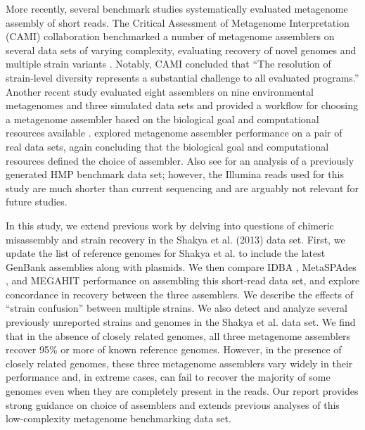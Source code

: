 \documentclass[11pt]{article}
\begin{document}

More recently, several benchmark studies systematically evaluated
metagenome assembly of short reads.  The Critical Assessment of
Metagenome Interpretation (CAMI) collaboration benchmarked a number of
metagenome assemblers on several data sets of varying complexity,
evaluating recovery of novel genomes and multiple strain variants
\cite{CAMI}.  Notably, CAMI concluded that ``The resolution of
strain-level diversity represents a substantial challenge to all
evaluated programs.''  Another recent study evaluated eight assemblers
on nine environmental metagenomes and three simulated data sets and
provided a workflow for choosing a metagenome assembler based on the
biological goal and computational resources available
\cite{metag_one}.  \cite{Vollmers2017} explored metagenome assembler
performance on a pair of real data sets, again concluding that the
biological goal and computational resources defined the choice of
assembler.  Also see \cite{Greenwald2017} for an analysis of a previously
generated HMP benchmark data set; however, the Illumina reads used for this
study are much shorter than current sequencing and are arguably not relevant
for future studies.

In this study, we extend previous work by delving into questions of
chimeric misassembly and strain recovery in the Shakya et al. (2013)
data set.  First, we update the list of reference genomes for Shakya
et al. to include the latest GenBank assemblies along with
plasmids. We then compare IDBA \cite{idba}, MetaSPAdes \cite{metaspades},
and MEGAHIT \cite{megahit} performance on assembling this short-read
data set, and explore concordance in recovery between the three
assemblers.  We describe the effects of ``strain confusion'' between
multiple strains.  We also detect and analyze several previously
unreported strains and genomes in the Shakya et al. data set.  We find
that in the absence of closely related genomes, all three metagenome
assemblers recover 95\% or more of known reference genomes.  However,
in the presence of closely related genomes, these three metagenome
assemblers vary widely in their performance and, in extreme cases, can
fail to recover the majority of some genomes even when they are
completely present in the reads.  Our report provides strong guidance
on choice of assemblers and extends previous analyses of this
low-complexity metagenome benchmarking data set.

\end{document}
